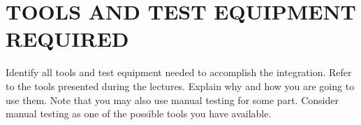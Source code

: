 \section{TOOLS AND TEST EQUIPMENT REQUIRED}
Identify  all  tools  and  test  equipment  needed  to  accomplish  the  integration.  Refer  to  the  tools  presented during the lectures. Explain why and how you are going to use them.  
Note  that  you  may  also  use  manual  testing  for  some  part.  Consider  manual  testing  as  one  of  the possible tools you have available. 

